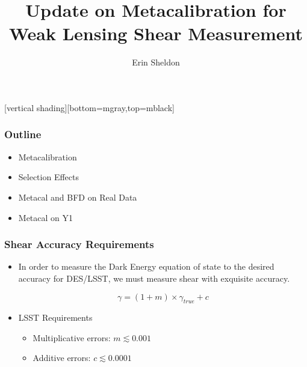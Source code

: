 \documentclass{beamer}
\title{Update on Metacalibration for Weak Lensing Shear Measurement}
\author{Erin Sheldon}
\institute{Brookhaven National Laboratory}
\begin{document}
\frame{\titlepage}


[vertical shading][bottom=mgray,top=mblack]

\frame
{
    \frametitle{Outline}

 
    \begin{itemize}

        \item Metacalibration

        \item Selection Effects

        \item Metacal and BFD on Real Data

        \item Metacal on Y1

    \end{itemize}

}

\frame
{
    \frametitle{Shear Accuracy Requirements}

 
    \begin{itemize}

        \item In order to measure the Dark Energy equation of state
            to the desired accuracy for DES/LSST, we must measure
            shear with exquisite accuracy.

            {\color{lightskyblue}
                \begin{equation}
                    \gamma = (1 + m ) \times \gamma_{true} + c \nonumber
                \end{equation}
            } 

        \item LSST Requirements
            \begin{itemize}
                \item Multiplicative errors: {\color{gold} $m \lesssim 0.001$}
                \item Additive errors: {\color{brightred} $c \lesssim 0.0001$}
            \end{itemize}


    \end{itemize}

}
\end{document}
